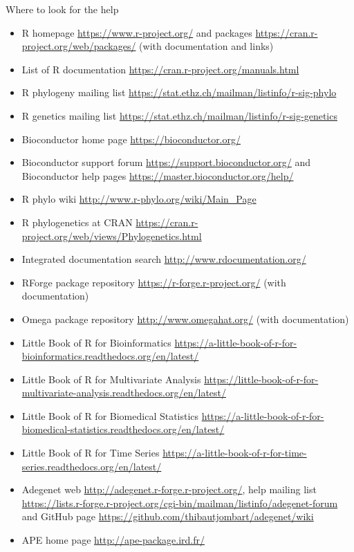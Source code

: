 \documentclass[compress, ucs, xelatex, 11pt, xcolor=svgnames,
  hyperref={
    bookmarks=true,
    unicode=true,
    colorlinks=true,
    pdftitle={Molecular data in R},
    plainpages=false,
    pdfauthor={Vojtech Zeisek},
    pdfsubject={Course about phylogeny and evolution in R},
    pdfcreator={XeLaTeX},
    pdfkeywords={R, evolution, phylogeny, molecular data},
    linkcolor=Tomato,
    anchorcolor=SaddleBrown,
    citecolor=Goldenrod,
    filecolor=DarkMagenta,
    menucolor=Sienna,
    urlcolor=DarkTurquoise,
    pdftex},
  url={hyphens, lowtilde} %
  ]{beamer}
\begin{document}
\begin{frame}[allowframebreaks]{Where to look for the help}
\begin{itemize}
 \item R homepage \url{https://www.r-project.org/} and packages \url{https://cran.r-project.org/web/packages/} (with documentation and links)
 \item List of R documentation \url{https://cran.r-project.org/manuals.html}
 \item R phylogeny mailing list \url{https://stat.ethz.ch/mailman/listinfo/r-sig-phylo}
 \item R genetics mailing list \url{https://stat.ethz.ch/mailman/listinfo/r-sig-genetics}
 \item Bioconductor home page \url{https://bioconductor.org/}
 \item Bioconductor support forum \url{https://support.bioconductor.org/} and Bioconductor help pages \url{https://master.bioconductor.org/help/}
 \item R phylo wiki \url{http://www.r-phylo.org/wiki/Main_Page}
 \item R phylogenetics at CRAN \url{https://cran.r-project.org/web/views/Phylogenetics.html}
 \item Integrated documentation search \url{http://www.rdocumentation.org/}
 \item RForge package repository \url{https://r-forge.r-project.org/} (with documentation)
 \item Omega package repository \url{http://www.omegahat.org/} (with documentation)
 \item Little Book of R for Bioinformatics \url{https://a-little-book-of-r-for-bioinformatics.readthedocs.org/en/latest/}
 \item Little Book of R for Multivariate Analysis \url{https://little-book-of-r-for-multivariate-analysis.readthedocs.org/en/latest/}
 \item Little Book of R for Biomedical Statistics \url{https://a-little-book-of-r-for-biomedical-statistics.readthedocs.org/en/latest/}
 \item Little Book of R for Time Series \url{https://a-little-book-of-r-for-time-series.readthedocs.org/en/latest/}
 \item Adegenet web \url{http://adegenet.r-forge.r-project.org/}, help mailing list \url{https://lists.r-forge.r-project.org/cgi-bin/mailman/listinfo/adegenet-forum} and GitHub page \url{https://github.com/thibautjombart/adegenet/wiki}
 \item APE home page \url{http://ape-package.ird.fr/}

\end{itemize}
\end{frame}
\end{document}
